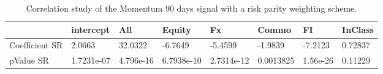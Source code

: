 \begin{table}[H]
\centering
\begin{tabular}{llllllll}
& intercept & All & Equity & Fx & Commo & FI & InClass \\ 
\hline 
Coefficient SR & 2.0663 & 32.0322 & -6.7649 & -5.4599 & -1.9839 & -7.2123 & 0.72837 \\ 
pValue SR & 1.7231e-07 & 4.796e-16 & 6.7938e-10 & 2.7314e-12 & 0.0013825 & 1.56e-26 & 0.11229 \\ 
\hline
\end{tabular}
\caption{Correlation study of the Momentum 90 days signal with a risk parity weighting scheme.}
\label{MOM90RP_CORR}
\end{table}